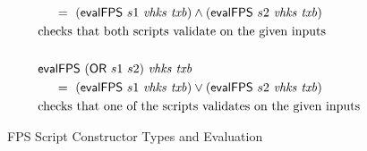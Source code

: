 \begin{figure*}[htb]
\begin{align*}
    &~~~~ =~ (\mathsf{evalFPS}~s1~\mathit{vhks}~\mathit{txb}) \wedge (\mathsf{evalFPS}~s2~\mathit{vhks}~\mathit{txb})  \\
    & \text {checks that both scripts validate on the given inputs}  \\~\\
    & \mathsf{evalFPS} ~(\mathsf{OR}~s1~s2)~\mathit{vhks}~\mathit{txb}\\
    &~~~~ =~ (\mathsf{evalFPS}~s1~\mathit{vhks}~\mathit{txb}) \vee (\mathsf{evalFPS}~s2~\mathit{vhks}~\mathit{txb}) \\
    & \text{checks that one of the scripts validates on the given inputs}
  \end{align*}
  \caption{FPS Script Constructor Types and Evaluation}
  \label{fig:defs:tx-mc-eval}
\end{figure*}

%
%
